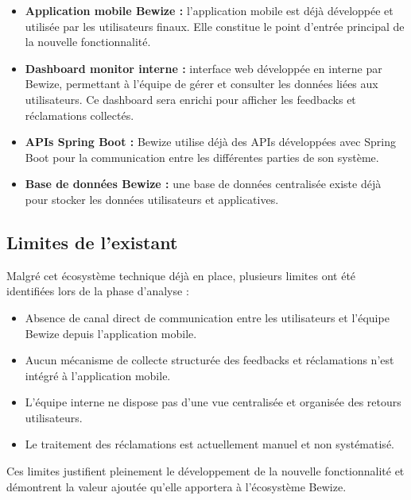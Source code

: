 \begin{itemize}
    \item \textbf{Application mobile Bewize :} l'application mobile est 
    déjà développée et utilisée par les utilisateurs finaux. Elle 
    constitue le point d'entrée principal de la nouvelle fonctionnalité.
    
    \item \textbf{Dashboard monitor interne :} interface web développée 
    en interne par Bewize, permettant à l'équipe de gérer et consulter 
    les données liées aux utilisateurs. Ce dashboard sera enrichi pour 
    afficher les feedbacks et réclamations collectés.
    
    \item \textbf{APIs Spring Boot :} Bewize utilise déjà des APIs 
    développées avec Spring Boot pour la communication entre les 
    différentes parties de son système.
    
    \item \textbf{Base de données Bewize :} une base de données 
    centralisée existe déjà pour stocker les données utilisateurs 
    et applicatives.
\end{itemize}

\subsection{Limites de l'existant}
Malgré cet écosystème technique déjà en place, plusieurs limites ont 
été identifiées lors de la phase d'analyse :

\begin{itemize}
    \item Absence de canal direct de communication entre les utilisateurs 
    et l'équipe Bewize depuis l'application mobile.
    \item Aucun mécanisme de collecte structurée des feedbacks et 
    réclamations n'est intégré à l'application mobile.
    \item L'équipe interne ne dispose pas d'une vue centralisée et 
    organisée des retours utilisateurs.
    \item Le traitement des réclamations est actuellement manuel et 
    non systématisé.
\end{itemize}

Ces limites justifient pleinement le développement de la nouvelle 
fonctionnalité et démontrent la valeur ajoutée qu'elle apportera 
à l'écosystème Bewize.

